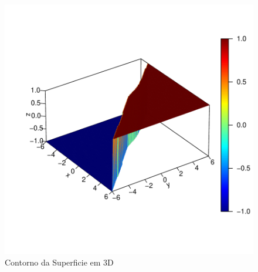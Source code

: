\documentclass[12pt,a4paper]{article}
\begin{document}
\begin{itemize}
\begin{figure}[!htb]
\begin{center}
\includegraphics{exELM-009}
\end{center}
\caption{Contorno da Superficie em 3D}
\label{Contorno da Superficie em 3D}
\end{figure}


\end{itemize}
\end{document}
